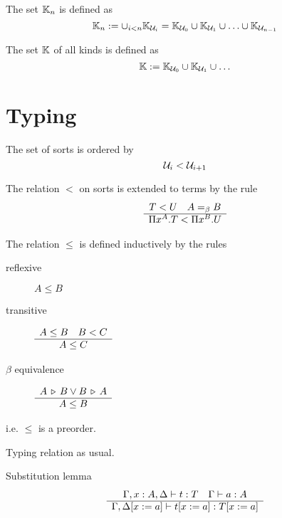 \begin{definition}
  The set $\mathbb{K}_n$ is defined as
  $$
  \mathbb{K}_n :=
  \cup_{i < n} \mathbb{K}_{{\cal U}_i} =
  \mathbb{K}_{{\cal U}_0} \cup \mathbb{K}_{{\cal U}_1} \cup \ldots \cup \mathbb{K}_{{\cal U}_{n-1}}
  $$
\end{definition}


\begin{definition}
  The set $\mathbb{K}$ of all kinds is defined as
  $$
  \mathbb{K} := \mathbb{K}_{{\cal U}_0} \cup \mathbb{K}_{{\cal U}_1} \cup \ldots
  $$
\end{definition}




\section{Typing}

\begin{definition}
  The set of sorts is ordered by
  $$
  {\cal U}_i < {\cal U}_{i+1}
  $$
\end{definition}


\begin{definition}
  The relation $<$ on sorts is extended to terms by the rule
  $$
  \begin{array}{c} T < U \quad A =_\beta B \\ \hline \Pi x^A. T < \Pi x^B. U\end{array}
  $$
\end{definition}


\begin{definition}
  The relation $\le$ is defined inductively by the rules
  \begin{description}
  \item[reflexive] $A \le B$
    
  \item[transitive] $\begin{array}{c} A \le B \quad B < C \\ \hline A \le C\end{array}$
    
  \item[$\beta$ equivalence] $\begin{array}{c} A \,\triangleright\, B \lor B \,\triangleright\, A \\ \hline A \le B\end{array}$
  \end{description}
  i.e. $\le$ is a preorder.
\end{definition}

\begin{definition}
  Typing relation as usual.
\end{definition}



\begin{theorem}
  Substitution lemma \label{substitutionlemma}
  $$
  \begin{array}{c} \Gamma,x:A,\Delta \vdash t : T
    \quad
    \Gamma \vdash a: A
   \\ \hline \Gamma,\Delta[x:=a] \vdash t[x:=a] : T[x:=a]\end{array}
  $$
\end{theorem}



